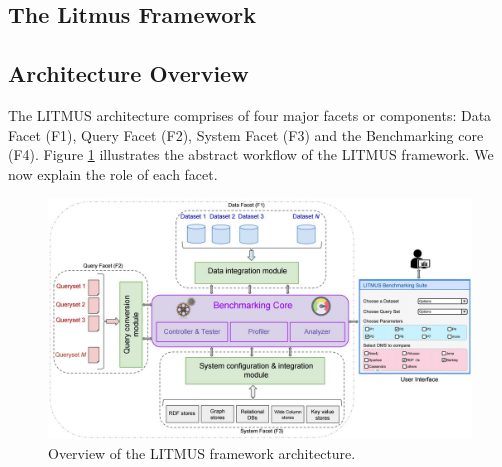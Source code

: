 \documentclass{llncs}
\newcommand{\todoinline}[1]{
    \todo[inline]{#1}
}
\begin{document}
\begin{itemize}
\section{The Litmus Framework}\label{litmus_framework}
        

    \subsection{Architecture Overview}
        The LITMUS architecture comprises of four major facets or components: Data Facet (F1), Query Facet (F2), System Facet (F3) and the Benchmarking core (F4). Figure \ref{fig:benchmark_arch} illustrates the abstract workflow of the LITMUS framework. We now explain the role of each facet. 
         
        \begin{figure}[h]
            \centering
            \includegraphics[scale=0.2]{images/benchmark_arch_latest_new}
            \caption{Overview of the LITMUS framework architecture.}
            \label{fig:benchmark_arch}
        \end{figure}
        

\end{itemize}
\end{document}
